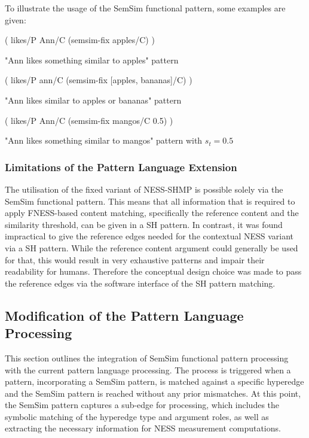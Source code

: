 \documentclass[11pt]{scrreprt}
\begin{document}
To illustrate the usage of the SemSim functional pattern, some examples are given:

\begin{pattern}[h!]
  \normalfont\sffamily
  \centering
  ( likes/P Ann/C (semsim-fix apples/C) )
  \caption{"Ann likes something similar to apples" pattern}
  \label{pat:ann-likes-semsim-aplles}
\end{pattern}

\begin{pattern}[h!]
  \normalfont\sffamily
  \centering
  ( likes/P ann/C (semsim-fix [apples, bananas]/C) )
  \caption{"Ann likes similar to apples or bananas" pattern}
  \label{pat:ann-likes-apples-and-bananas}
\end{pattern}


\begin{pattern}[h!]
  \normalfont\sffamily
  \centering
  ( likes/P Ann/C (semsim-fix mangos/C 0.5) )
  \caption{"Ann likes something similar to mangos" pattern with \(s_t = 0.5\)}
  \label{pat:ann-likes-semsim-aplles}
\end{pattern}


\subsubsection{Limitations of the Pattern Language Extension}
\label{sec:pl-extension-limitations}
The utilisation of the fixed variant of NESS-SHMP is possible solely via the SemSim functional pattern. This means that all information that is required to apply FNESS-based content matching, specifically the reference content and the similarity threshold, can be given in a SH pattern. In contrast, it was found impractical to give the reference edges needed for the contextual NESS variant via a SH pattern. While the reference content argument could generally be used for that, this would result in very exhaustive patterns and impair their readability for humans. Therefore the conceptual design choice was made to pass the reference edges via the software interface of the SH pattern matching.


\subsection{Modification of the Pattern Language Processing}
This section outlines the integration of SemSim functional pattern processing with the current pattern language processing. The process is triggered when a pattern, incorporating a SemSim pattern, is matched against a specific hyperedge and the SemSim pattern is reached without any prior mismatches. At this point, the SemSim pattern captures a sub-edge for processing, which includes the symbolic matching of the hyperedge type and argument roles, as well as extracting the necessary information for NESS measurement computations.
\end{document}

